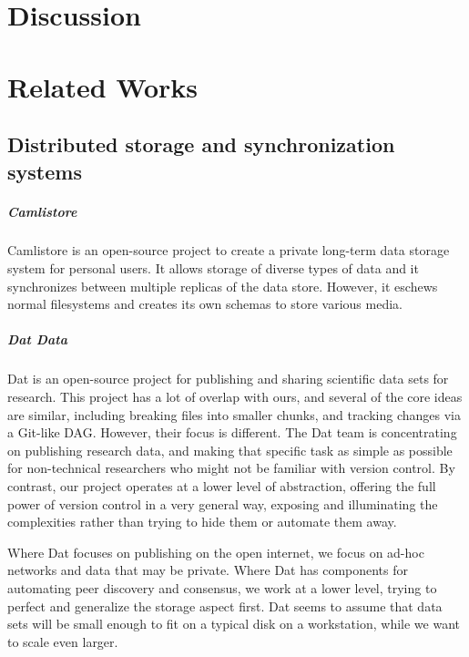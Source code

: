 \documentclass[12pt,a4paper,two-side]{book}
\begin{document}
\chapter{Discussion}









\chapter{Related Works}

\section{Distributed storage and synchronization systems}

\paragraph{Camlistore}

Camlistore \cite{camlistore_homepage} is an open-source project to create a
private long-term data storage system for personal users. It allows storage of
diverse types of data and it synchronizes between multiple replicas of the data
store. However, it eschews normal filesystems and creates its own schemas to
store various media.


\paragraph{Dat Data}

Dat \cite{dat_homepage} is an open-source project for publishing and sharing
scientific data sets for research. This project has a lot of overlap with ours,
and several of the core ideas are similar, including breaking files into smaller
chunks, and tracking changes via a Git-like DAG. However, their focus is
different. The Dat team is concentrating on publishing research data, and making
that specific task as simple as possible for non-technical researchers who might
not be familiar with version control. By contrast, our project operates at a
lower level of abstraction, offering the full power of version control in a very
general way, exposing and illuminating the complexities rather than trying to
hide them or automate them away.

Where Dat focuses on publishing on the open internet, we focus on ad-hoc
networks and data that may be private. Where Dat has components for automating
peer discovery and consensus, we work at a lower level, trying to perfect and
generalize the storage aspect first. Dat seems to assume that data sets will be
small enough to fit on a typical disk on a workstation, while we want to scale
even larger.
\end{document}
